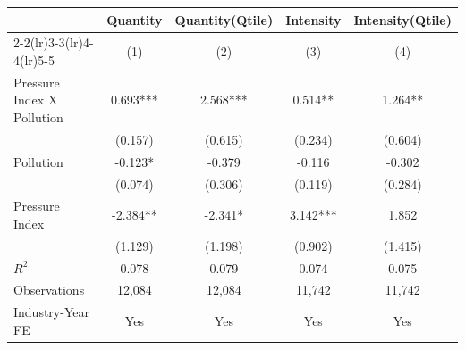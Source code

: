 {
\def\sym#1{\ifmmode^{#1}\else\(^{#1}\)\fi}
\begin{tabular}{l*{4}{c}}
\toprule
                    &\multicolumn{1}{c}{Quantity}&\multicolumn{1}{c}{Quantity(Qtile)}&\multicolumn{1}{c}{Intensity}&\multicolumn{1}{c}{Intensity(Qtile)}\\\cmidrule(lr){2-2}\cmidrule(lr){3-3}\cmidrule(lr){4-4}\cmidrule(lr){5-5}
                    &\multicolumn{1}{c}{(1)}   &\multicolumn{1}{c}{(2)}   &\multicolumn{1}{c}{(3)}   &\multicolumn{1}{c}{(4)}   \\
\midrule
Pressure Index X Pollution&       0.693***&       2.568***&       0.514** &       1.264** \\
                    &     (0.157)   &     (0.615)   &     (0.234)   &     (0.604)   \\
\addlinespace
Pollution           &      -0.123*  &      -0.379   &      -0.116   &      -0.302   \\
                    &     (0.074)   &     (0.306)   &     (0.119)   &     (0.284)   \\
\addlinespace
Pressure Index      &      -2.384** &      -2.341*  &       3.142***&       1.852   \\
                    &     (1.129)   &     (1.198)   &     (0.902)   &     (1.415)   \\
\midrule
\(R^{2}\)           &       0.078   &       0.079   &       0.074   &       0.075   \\
Observations        &      12,084   &      12,084   &      11,742   &      11,742   \\
Industry-Year FE    &         Yes   &         Yes   &         Yes   &         Yes   \\
\bottomrule
\end{tabular}
}
